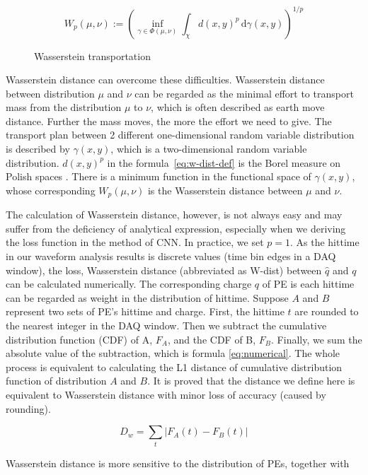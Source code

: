 \label{sub:Wasserstein distance}
\begin{minipage}{.45\textwidth}
\begin{equation}
    W_{p}(\mu,\nu):=\left(\inf_{\gamma\in\Phi(\mu,\nu)}\int_{\chi}d(x,y)^{p}\,\mathrm{d}\gamma(x,y)\right)^{1/p} \label{eq:w-dist-def}
\end{equation}
\end{minipage}
\begin{minipage}{.55\textwidth}
\begin{figure}[H]
    \centering
    \scalebox{0.4}{}
    \caption{\label{fig:Wasserstein transportation} Wasserstein transportation}
\end{figure}
\end{minipage}

Wasserstein distance can overcome these difficulties. Wasserstein distance between distribution $\mu$ and $\nu$ can be regarded as the minimal effort to transport mass from the distribution $\mu$ to $\nu$, which is often described as earth move distance. Further the mass moves, the more the effort we need to give. The transport plan between 2 different one-dimensional random variable distribution is described by $\gamma(x, y)$, which is a two-dimensional random variable distribution. $d(x,y)^{p}$ in the formula~\eqref{eq:w-dist-def} is the Borel measure on Polish spaces \cite{villani_2009}. There is a minimum function in the functional space of $\gamma(x, y)$, whose corresponding $W_{p}(\mu,\nu)$ is the Wasserstein distance between $\mu$ and $\nu$. 

The calculation of Wasserstein distance, however, is not always easy and may suffer from the deficiency of analytical expression, especially when we deriving the loss function in the method of CNN. In practice, we set $p=1$. As the hittime in our waveform analysis results is discrete values (time bin edges in a DAQ window), the loss, Wasserstein distance (abbreviated as W-dist) between $\hat{q}$ and $q$ can be calculated numerically. The corresponding charge $q$ of PE is each hittime can be regarded as weight in the distribution of hittime. Suppose $A$ and $B$ represent two sets of PE's hittime and charge. First, the hittime $t$ are rounded to the nearest integer in the DAQ window. Then we subtract the cumulative distribution function (CDF) of A, $F_{A}$, and the CDF of B, $F_{B}$. Finally, we sum the absolute value of the subtraction, which is formula \eqref{eq:numerical}. The whole process is equivalent to calculating the L1 distance of cumulative distribution function of distribution $A$ and $B$. It is proved that the distance we define here is equivalent to Wasserstein distance with minor loss of accuracy (caused by rounding). 

\begin{equation}
    D_w = \sum_t|F_{A}(t) - F_{B}(t)|
    \label{eq:numerical}
\end{equation}

Wasserstein distance is more sensitive to the distribution of PEs, together with 